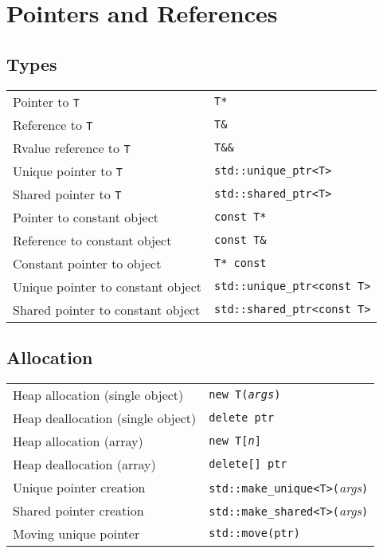 \section{Pointers and References}

\subsection{Types}
\begin{center}
  \begin{tabular}{ll}
    Pointer to \verb'T' & \verb'T*' \\
    Reference to \verb'T' & \verb'T&' \\
    Rvalue reference to \verb'T' & \verb'T&&' \\
    Unique pointer to \verb'T' & \verb'std::unique_ptr<T>' \\
    Shared pointer to \verb'T' & \verb'std::shared_ptr<T>' \\
    Pointer to constant object & \verb'const T*' \\
    Reference to constant object & \verb'const T&' \\
    Constant pointer to object & \verb'T* const' \\
    Unique pointer to constant object & \verb'std::unique_ptr<const T>' \\
    Shared pointer to constant object & \verb'std::shared_ptr<const T>' \\
  \end{tabular}
\end{center}

\subsection{Allocation}
\begin{center}
  \begin{tabular}{ll}
    Heap allocation (single object) & \tt new T({\it args}) \\
    Heap deallocation (single object) & \tt delete ptr \\
    Heap allocation (array) & \tt new T[{\it n}] \\
    Heap deallocation (array) & \tt delete[] ptr \\
    Unique pointer creation & \verb'std::make_unique<T>('{\it args}\verb')' \\
    Shared pointer creation & \verb'std::make_shared<T>('{\it args}\verb')' \\
    Moving unique pointer & \verb'std::move(ptr)' \\
  \end{tabular}
\end{center}


